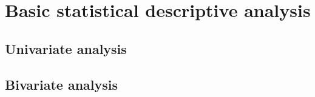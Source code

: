 

\section{Basic statistical descriptive analysis}%
\label{sec:basic_statistical_descriptive_analysis}

\subsection{Univariate analysis}%
\label{sub:univariate_analysis}

\subsection{Bivariate analysis}%
\label{sub:bivariate_analysis}



